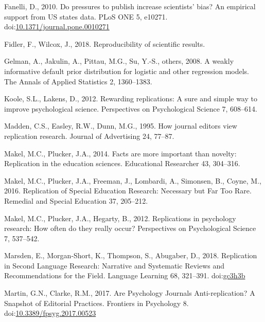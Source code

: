 \documentclass[]{elsarticle} %
\newlength{\cslhangindent}
\newlength{\cslentryspacingunit} %
\newenvironment{CSLReferences}[2] %
 {%
  \setlength{\parindent}{0pt}
  \ifodd #1
  \let\oldpar\par
  \def\par{\hangindent=\cslhangindent\oldpar}
  \fi
  \setlength{\parskip}{#2\cslentryspacingunit}
 }%
 {}
\begin{document}
\begin{CSLReferences}{1}{0}
\leavevmode{}%
Fanelli, D., 2010. Do pressures to publish increase scientists' bias? An
empirical support from US states data. PLoS ONE 5, e10271.
doi:\href{https://doi.org/10.1371/journal.pone.0010271}{10.1371/journal.pone.0010271}

\leavevmode{}%
Fidler, F., Wilcox, J., 2018. Reproducibility of scientific results.

\leavevmode{}%
Gelman, A., Jakulin, A., Pittau, M.G., Su, Y.-S., others, 2008. A weakly
informative default prior distribution for logistic and other regression
models. The Annals of Applied Statistics 2, 1360--1383.

\leavevmode{}%
Koole, S.L., Lakens, D., 2012. Rewarding replications: {A} sure and
simple way to improve psychological science. Perspectives on
Psychological Science 7, 608--614.

\leavevmode{}%
Madden, C.S., Easley, R.W., Dunn, M.G., 1995. How journal editors view
replication research. Journal of Advertising 24, 77--87.

\leavevmode{}%
Makel, M.C., Plucker, J.A., 2014. Facts are more important than novelty:
{Replication} in the education sciences. Educational Researcher 43,
304--316.

\leavevmode{}%
Makel, M.C., Plucker, J.A., Freeman, J., Lombardi, A., Simonsen, B.,
Coyne, M., 2016. Replication of {Special} {Education} {Research}:
{Necessary} but {Far} {Too} {Rare}. Remedial and Special Education 37,
205--212.

\leavevmode{}%
Makel, M.C., Plucker, J.A., Hegarty, B., 2012. Replications in
psychology research: {How} often do they really occur? Perspectives on
Psychological Science 7, 537--542.

\leavevmode{}%
Marsden, E., Morgan‐Short, K., Thompson, S., Abugaber, D., 2018.
Replication in {Second} {Language} {Research}: {Narrative} and
{Systematic} {Reviews} and {Recommendations} for the {Field}. Language
Learning 68, 321--391. doi:\href{https://doi.org/gc3h3b}{gc3h3b}

\leavevmode{}%
Martin, G.N., Clarke, R.M., 2017. Are {Psychology} {Journals}
{Anti}-replication? {A} {Snapshot} of {Editorial} {Practices}. Frontiers
in Psychology 8.
doi:\href{https://doi.org/10.3389/fpsyg.2017.00523}{10.3389/fpsyg.2017.00523}


\end{CSLReferences}
\end{document}
